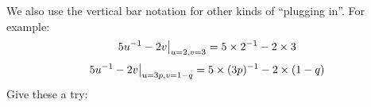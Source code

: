 \newpage

We also use the vertical bar notation for other kinds of ``plugging in''.
For example:
\begin{equation*}
 \left.5u^{-1} - 2v\right|_{u = 2, v = 3} = 5 \times 2^{-1} - 2 \times 3
\end{equation*}
\begin{equation*}
 \left.5u^{-1} - 2v\right|_{u = 3p, v = 1-q} = 5 \times (3p)^{-1} - 2 \times (1-q)
\end{equation*}
Give these a try:

\begin{multicols}{2}
 \large
 \begin{ProblemSet}[pencil space=1.5in]
 \end{ProblemSet}
\end{multicols}

\newpage

